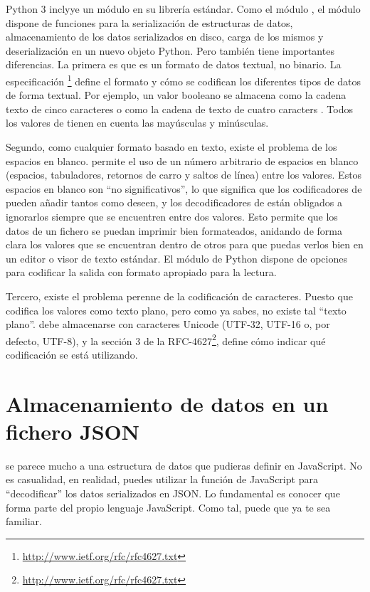Python 3 inclyye un módulo  en su librería estándar. Como el módulo , el módulo  dispone de funciones para la serialización de estructuras de datos, almacenamiento de los datos serializados en disco, carga de los mismos y deserialización en un nuevo objeto Python. Pero también tiene importantes diferencias. La primera es que  es un formato de datos textual, no binario. La especificación \footnote{\href{http://www.ietf.org/rfc/rfc4627.txt}{http://www.ietf.org/rfc/rfc4627.txt}} define el formato y cómo se codifican los diferentes tipos de datos de forma textual. Por ejemplo, un valor booleano se almacena como la cadena texto de cinco caracteres  o como la cadena de texto de cuatro caracters . Todos los valores de  tienen en cuenta las mayúsculas y minúsculas.

Segundo, como cualquier formato basado en texto, existe el problema de los espacios en blanco.  permite el uso de un número arbitrario de espacios en blanco (espacios, tabuladores, retornos de carro y saltos de línea) entre los valores. Estos espacios en blanco son ``no significativos'', lo que significa que los codificadores de  pueden añadir tantos como deseen, y los decodificadores de  están obligados a ignorarlos siempre que se encuentren entre dos valores. Esto permite que los datos de un fichero  se puedan imprimir bien formateados, anidando de forma clara los valores que se encuentran dentro de otros para que puedas verlos bien en un editor o visor de texto estándar. El módulo  de Python dispone de opciones para codificar la salida con formato apropiado para la lectura.

Tercero, existe el problema perenne de la codificación de caracteres. Puesto que  codifica los valores como texto plano, pero como ya sabes, no existe tal ``texto plano''.  debe almacenarse con caracteres Unicode (UTF-32, UTF-16 o, por defecto, UTF-8), y la sección 3 de la RFC-4627\footnote{\href{http://www.ietf.org/rfc/rfc4627.txt}{http://www.ietf.org/rfc/rfc4627.txt}}, define cómo indicar qué codificación se está utilizando. 

\section{Almacenamiento de datos en un fichero JSON}

 se parece mucho a una estructura de datos que pudieras definir en JavaScript. No es casualidad, en realidad, puedes utilizar la función  de JavaScript para ``decodificar'' los datos serializados en JSON. Lo fundamental es conocer que  forma parte del propio lenguaje JavaScript. Como tal,  puede que ya te sea familiar.

